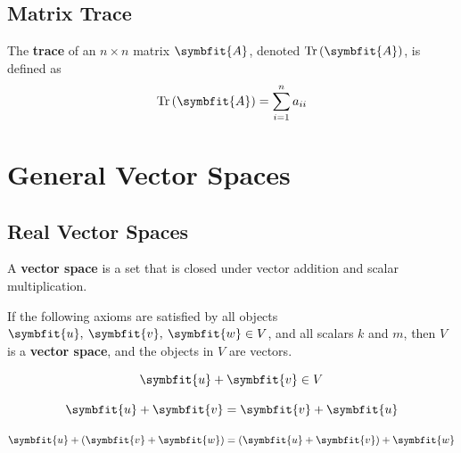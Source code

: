 \documentclass{article}
\begin{document}
	\subsection{Matrix Trace}
	\begin{definition}
		The \textbf{trace} of an $n \times n$ matrix $\symbfit{A}$, denoted $\tr{\left( \symbfit{A} \right)}$, is defined as
		\begin{equation*}
			\tr{\left( \symbfit{A} \right)} = \sum_{i=1}^n a_{ii}
		\end{equation*}
	\end{definition}
	\newpage
\section{General Vector Spaces}
	\subsection{Real Vector Spaces}
	\begin{definition}
		A \textbf{vector space} is a set that is closed under vector addition and scalar \linebreak multiplication.
	\end{definition}
	\begin{theorem}
		If the following axioms are satisfied by all objects $\symbfit{u},\: \symbfit{v},\: \symbfit{w} \in V$, and all scalars $k$ and $m$, then $V$ is a \textbf{vector space}, and the objects in $V$ are vectors.
	\end{theorem}
	\begin{axiom} 
		\begin{equation*} \label{axiom:5_1_1}
			\symbfit{u}+\symbfit{v} \in V 
		\end{equation*}
	\end{axiom}
	\begin{axiom} 
		\begin{equation*} \label{axiom:5_1_2}
			\symbfit{u} + \symbfit{v} = \symbfit{v} + \symbfit{u}
		\end{equation*}
	\end{axiom}
	\begin{axiom} 
		\begin{equation*} \label{axiom:5_1_3}
			\symbfit{u} + \left(\symbfit{v} + \symbfit{w}\right) = \left(\symbfit{u} + \symbfit{v}\right) + \symbfit{w}
		\end{equation*}
	\end{axiom}
\end{document}
